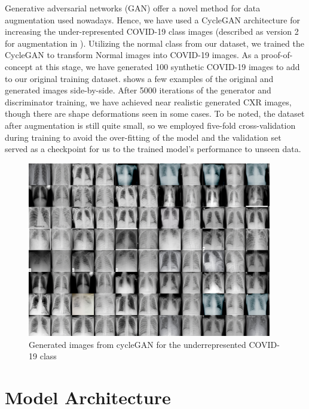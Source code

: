 Generative adversarial networks (GAN) offer a novel method for data augmentation used nowadays. Hence, we have used a CycleGAN \cite{zhu2017unpaired} architecture for increasing the under-represented COVID-19 class images (described as version 2 for augmentation in ).  Utilizing the normal class from our dataset, we trained the CycleGAN to transform Normal images into COVID-19 images. As a proof-of-concept at this stage, we have generated 100 synthetic COVID-19 images to add to our original training dataset.  shows a few examples of the original and generated images side-by-side. After 5000 iterations of the generator and discriminator training, we have achieved near realistic generated CXR images, though there are shape deformations seen in some cases. To be noted, the dataset after augmentation is still quite small, so we employed five-fold cross-validation during training to avoid the over-fitting
of the model and the validation set served as a checkpoint for us to the trained model's performance to unseen data.
\begin{figure}
\centering
\includegraphics[width=0.95\textwidth]{images/GENARATED IMAGES.png}
   \caption{ Generated images from cycleGAN for the underrepresented COVID-19 class}
\label{fig:gan}
\end{figure}





\section{Model Architecture}
\label{sec:Methods}


